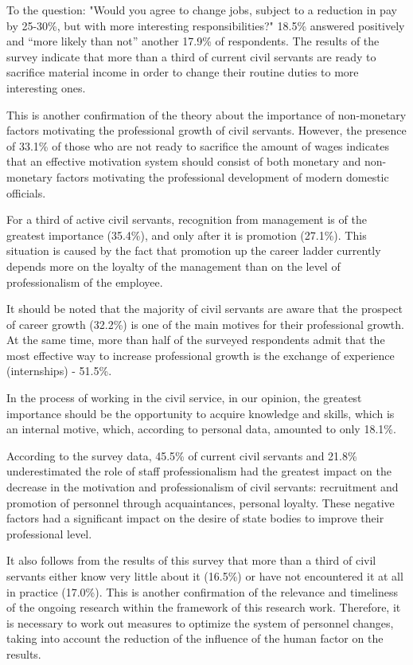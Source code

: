 \begin{multicols}{2}
To the question: "Would you agree to change jobs, subject to a reduction
in pay by 25-30\%, but with more interesting responsibilities?" 18.5\%
answered positively and ``more likely than not'' another 17.9\% of
respondents. The results of the survey indicate that more than a third
of current civil servants are ready to sacrifice material income in
order to change their routine duties to more interesting ones.

This is another confirmation of the theory about the importance of
non-monetary factors motivating the professional growth of civil
servants. However, the presence of 33.1\% of those who are not ready to
sacrifice the amount of wages indicates that an effective motivation
system should consist of both monetary and non-monetary factors
motivating the professional development of modern domestic officials.

For a third of active civil servants, recognition from management is of
the greatest importance (35.4\%), and only after it is promotion
(27.1\%). This situation is caused by the fact that promotion up the
career ladder currently depends more on the loyalty of the management
than on the level of professionalism of the employee.

It should be noted that the majority of civil servants are aware that
the prospect of career growth (32.2\%) is one of the main motives for
their professional growth. At the same time, more than half of the
surveyed respondents admit that the most effective way to increase
professional growth is the exchange of experience (internships) -
51.5\%.

In the process of working in the civil service, in our opinion, the
greatest importance should be the opportunity to acquire knowledge and
skills, which is an internal motive, which, according to personal data,
amounted to only 18.1\%.

According to the survey data, 45.5\% of current civil servants and
21.8\% underestimated the role of staff professionalism had the greatest
impact on the decrease in the motivation and professionalism of civil
servants: recruitment and promotion of personnel through acquaintances,
personal loyalty. These negative factors had a significant impact on the
desire of state bodies to improve their professional level.

It also follows from the results of this survey that more than a third
of civil servants either know very little about it (16.5\%) or have not
encountered it at all in practice (17.0\%). This is another confirmation
of the relevance and timeliness of the ongoing research within the
framework of this research work. Therefore, it is necessary to work out
measures to optimize the system of personnel changes, taking into
account the reduction of the influence of the human factor on the
results.


\end{multicols}
